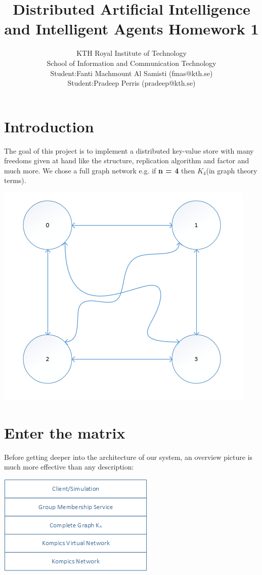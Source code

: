 \documentclass[a4paper, 11pt]{article}
\title{\textbf{Distributed Artificial Intelligence and Intelligent Agents Homework 1}}
\author{KTH Royal Institute of Technology \\ 
		School of Information and Communication Technology \\
		Student:Fanti Machmount Al Samisti (fmas@kth.se) \\
		Student:Pradeep Perris (pradeep@kth.se)}
\begin{document}
	
\maketitle

\tableofcontents

\clearpage

\section{Introduction}

\noindent The goal of this project is to implement a distributed key-value store with many freedoms given at hand like the structure, replication algorithm and factor and much more. We chose a full graph network e.g. if \textbf{n = 4} then $K_4$(in graph theory terms). 

{\centering\includegraphics[scale = 0.9]{./figures/network-overview.png}\par}

\section{Enter the matrix}

\noindent Before getting deeper into the architecture of our system, an overview picture is much more effective than any description:

{\centering\includegraphics[scale = 0.9]{./figures/architecture.png}\par}
\end{document}
